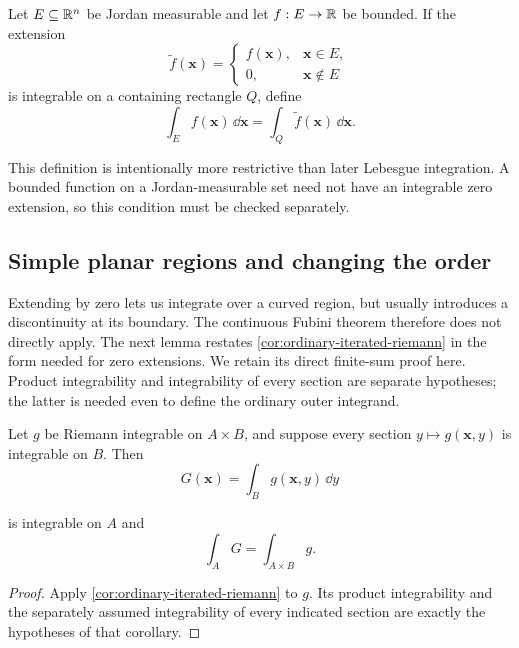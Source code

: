 \begin{definition}
Let $E\subseteq\mathbb{R}^n$ be Jordan measurable and let $f:E\to\mathbb{R}$ be bounded.
If the extension
\[
\widetilde f(\mathbf{x})=
\begin{cases}
f(\mathbf{x}),&\mathbf{x}\in E,\\
0,&\mathbf{x}\notin E
\end{cases}
\]
is integrable on a containing rectangle $Q$, define
\[
\int_Ef(\mathbf{x})\,\dd\mathbf{x}=\int_Q\widetilde f(\mathbf{x})\,\dd\mathbf{x}.
\]
\end{definition}

\begin{remark}
This definition is intentionally more restrictive than later Lebesgue
integration.  A bounded function on a Jordan-measurable set need not have an
integrable zero extension, so this condition must be checked separately.
\end{remark}




\subsection{Simple planar regions and changing the order}

Extending by zero lets us integrate over a curved region, but usually
introduces a discontinuity at its boundary. The continuous Fubini theorem
therefore does not directly apply. The next lemma restates
\cref{cor:ordinary-iterated-riemann} in the form needed for zero extensions.
We retain its direct finite-sum proof here. Product integrability and
integrability of every section are separate hypotheses; the latter is
needed even to define the ordinary outer integrand.

\begin{lemma}
\label{lem:fubini-integrable-sections}
Let $g$ be Riemann integrable on $A\times B$, and suppose every section
$y\mapsto g(\mathbf{x},y)$ is integrable on $B$. Then
\[
G(\mathbf{x})=\int_Bg(\mathbf{x},y)\,\dd y
\]

is integrable on $A$ and
\[
\int_A G=\int_{A\times B}g.
\]

\end{lemma}
\begin{proof}
Apply \cref{cor:ordinary-iterated-riemann} to $g$.
Its product integrability and the separately assumed integrability of
every indicated section are exactly the hypotheses of that corollary.
\end{proof}

